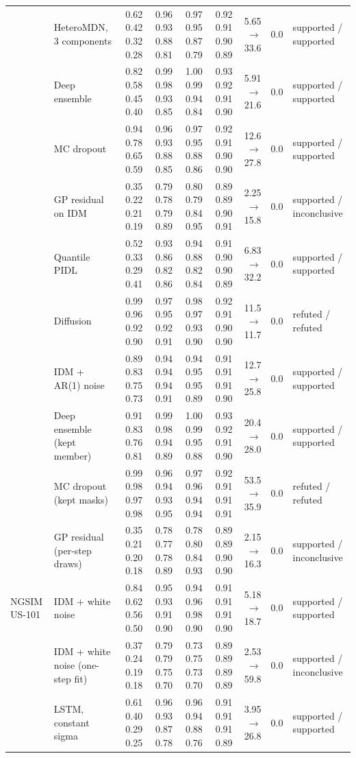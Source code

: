 \begin{longtable}{llrrrrrrl}
 & HeteroMDN, 3 components & 0.62 0.42 0.32 0.28 & 0.96 0.93 0.88 0.81 & 0.97 0.95 0.87 0.79 & 0.92 0.91 0.90 0.89 & 5.65 $\rightarrow$ 33.6 & 0.0 & supported / supported \\
 & Deep ensemble & 0.82 0.58 0.45 0.40 & 0.99 0.98 0.93 0.85 & 1.00 0.99 0.94 0.84 & 0.93 0.92 0.91 0.90 & 5.91 $\rightarrow$ 21.6 & 0.0 & supported / supported \\
 & MC dropout & 0.94 0.78 0.65 0.59 & 0.96 0.93 0.88 0.85 & 0.97 0.95 0.88 0.86 & 0.92 0.91 0.90 0.90 & 12.6 $\rightarrow$ 27.8 & 0.0 & supported / supported \\
 & GP residual on IDM & 0.35 0.22 0.21 0.19 & 0.79 0.78 0.79 0.89 & 0.80 0.79 0.84 0.95 & 0.89 0.89 0.90 0.91 & 2.25 $\rightarrow$ 15.8 & 0.0 & supported / inconclusive \\
 & Quantile PIDL & 0.52 0.33 0.29 0.41 & 0.93 0.86 0.82 0.86 & 0.94 0.88 0.82 0.84 & 0.91 0.90 0.90 0.89 & 6.83 $\rightarrow$ 32.2 & 0.0 & supported / supported \\
 & Diffusion & 0.99 0.96 0.92 0.90 & 0.97 0.95 0.92 0.91 & 0.98 0.97 0.93 0.90 & 0.92 0.91 0.90 0.90 & 11.5 $\rightarrow$ 11.7 & 0.0 & refuted / refuted \\
 & IDM + AR(1) noise & 0.89 0.83 0.75 0.73 & 0.94 0.94 0.94 0.91 & 0.94 0.95 0.95 0.89 & 0.91 0.91 0.91 0.90 & 12.7 $\rightarrow$ 25.8 & 0.0 & supported / supported \\
 & Deep ensemble (kept member) & 0.91 0.83 0.76 0.81 & 0.99 0.98 0.94 0.89 & 1.00 0.99 0.95 0.88 & 0.93 0.92 0.91 0.90 & 20.4 $\rightarrow$ 28.0 & 0.0 & supported / supported \\
 & MC dropout (kept masks) & 0.99 0.98 0.97 0.98 & 0.96 0.94 0.93 0.95 & 0.97 0.96 0.94 0.94 & 0.92 0.91 0.91 0.91 & 53.5 $\rightarrow$ 35.9 & 0.0 & refuted / refuted \\
 & GP residual (per-step draws) & 0.35 0.21 0.20 0.18 & 0.78 0.77 0.78 0.89 & 0.78 0.80 0.84 0.93 & 0.89 0.89 0.90 0.90 & 2.15 $\rightarrow$ 16.3 & 0.0 & supported / inconclusive \\
\midrule
NGSIM US-101 & IDM + white noise & 0.84 0.62 0.56 0.50 & 0.95 0.93 0.91 0.90 & 0.94 0.96 0.98 0.90 & 0.91 0.91 0.91 0.90 & 5.18 $\rightarrow$ 18.7 & 0.0 & supported / supported \\
 & IDM + white noise (one-step fit) & 0.37 0.24 0.19 0.18 & 0.79 0.79 0.75 0.70 & 0.73 0.75 0.73 0.70 & 0.89 0.89 0.89 0.89 & 2.53 $\rightarrow$ 59.8 & 0.0 & supported / inconclusive \\
 & LSTM, constant sigma & 0.61 0.40 0.29 0.25 & 0.96 0.93 0.87 0.78 & 0.96 0.94 0.88 0.76 & 0.91 0.91 0.91 0.89 & 3.95 $\rightarrow$ 26.8 & 0.0 & supported / supported \\

\end{longtable}
